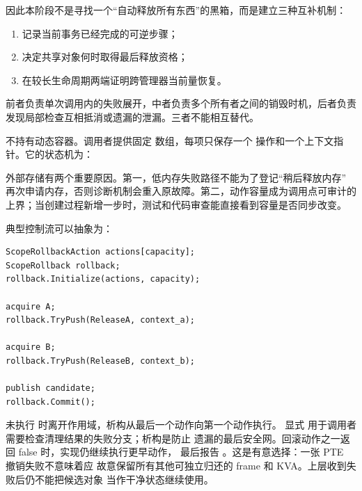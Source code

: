 因此本阶段不是寻找一个“自动释放所有东西”的黑箱，而是建立三种互补机制：

\begin{enumerate}[label=\arabic*.]
  \item {} 记录当前事务已经完成的可逆步骤；
  \item {} 决定共享对象何时取得最后释放资格；
  \item {} 在较长生命周期两端证明跨管理器当前量恢复。
\end{enumerate}

前者负责单次调用内的失败展开，中者负责多个所有者之间的销毁时机，后者负责
发现局部检查互相抵消或遗漏的泄漏。三者不能相互替代。

 不持有动态容器。调用者提供固定
 数组，每项只保存一个
 操作和一个上下文指针。它的状态机为：

\begin{center}
\end{center}

外部存储有两个重要原因。第一，低内存失败路径不能为了登记“稍后释放内存”
再次申请内存，否则诊断机制会重入原故障。第二，动作容量成为调用点可审计的
上界；当创建过程新增一步时，测试和代码审查能直接看到容量是否同步改变。

典型控制流可以抽象为：

\begin{verbatim}
ScopeRollbackAction actions[capacity];
ScopeRollback rollback;
rollback.Initialize(actions, capacity);

acquire A;
rollback.TryPush(ReleaseA, context_a);

acquire B;
rollback.TryPush(ReleaseB, context_b);

publish candidate;
rollback.Commit();
\end{verbatim}

未执行  时离开作用域，析构从最后一个动作向第一个动作执行。
显式  用于调用者需要检查清理结果的失败分支；析构是防止
遗漏的最后安全网。回滚动作之一返回 false 时，实现仍继续执行更早动作，
最后报告 。这是有意选择：一张 PTE 撤销失败不意味着应
故意保留所有其他可独立归还的 frame 和 KVA。上层收到失败后仍不能把候选对象
当作干净状态继续使用。

